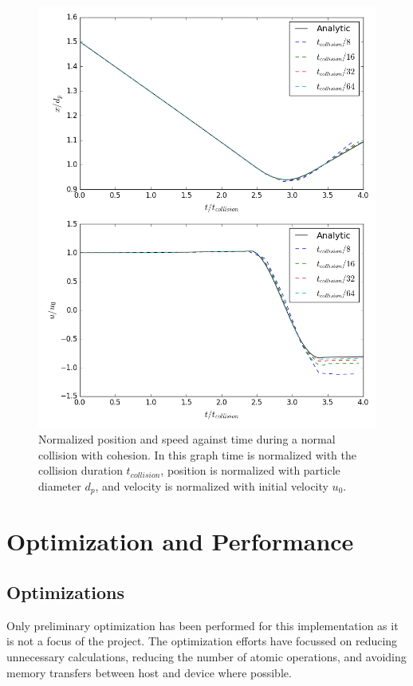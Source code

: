 \documentclass[a4paper,11pt,titlepage]{report}
\begin{document}
\begin{figure}[!htb]
\centering
\includegraphics[scale=0.7]{figures/opencl_verification/cohesion_verification.png}
\caption{Normalized position and speed against time during a normal collision with cohesion. In this graph time is normalized with the collision duration $t_{collision}$, position is normalized with particle diameter $d_p$, and velocity is normalized with initial velocity $u_0$.}
\label{fig:opencl_cohesion_verification}
\end{figure}
\section{Optimization and Performance}
\subsection{Optimizations}
Only preliminary optimization has been performed for this implementation as it is not a focus of the project. The optimization efforts have focussed on reducing unnecessary calculations, reducing the number of atomic operations, and avoiding memory transfers between host and device where possible.
\end{document}
